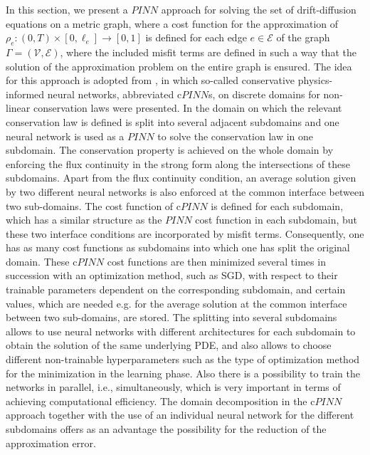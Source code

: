 In this section, we present a $PINN$ approach for solving the set of drift-diffusion equations on a metric graph, where a cost function for the approximation of $\rho_e \colon (0,T) \times [0, \ell_e] \to [0, 1]$ is defined for each edge $e \in \mathcal{E}$ of the graph $\Gamma = (\mathcal{V}, \mathcal{E})$, where the included misfit terms are defined in such a way that the solution of the approximation problem on the entire graph is ensured. The idea for this approach is adopted from \cite{JagtapKharazmiKarniadakis:2020}, in which so-called conservative physics-informed neural networks, abbreviated c$PINN$s, on discrete domains for non-linear conservation laws were presented. In \cite{JagtapKharazmiKarniadakis:2020} the domain on which the relevant conservation law is defined is split into several adjacent subdomains and one neural network is used as a $PINN$ to solve the conservation law in one subdomain. The conservation property is achieved on the whole domain by enforcing the flux continuity in the strong form along the intersections of these subdomains. Apart from the flux continuity condition, an average solution given by two different neural networks is also enforced at the common interface between two sub-domains. The cost function of c$PINN$ is defined for each subdomain, which has a similar structure as the $PINN$ cost function in each subdomain, but these two interface conditions are incorporated by misfit terms. Consequently, one has as many cost functions as subdomains into which one has split the original domain. These c$PINN$ cost functions are then minimized several times in succession with an optimization method, such as SGD, with respect to their trainable parameters dependent on the corresponding subdomain, and certain values, which are needed e.g. for the average solution at the common interface between two sub-domains, are stored. The splitting into several subdomains allows to use neural networks with different architectures for each subdomain to obtain the solution of the same underlying PDE, and also allows to choose different non-trainable hyperparameters such as the type of optimization method for the minimization in the learning phase. Also there is a possibility to train the networks in parallel, i.e., simultaneously, which is very important in terms of achieving computational efficiency. The domain decomposition in the c$PINN$ approach together with the use of an individual neural network for the different subdomains offers as an advantage the possibility for the reduction of the approximation error. \\
